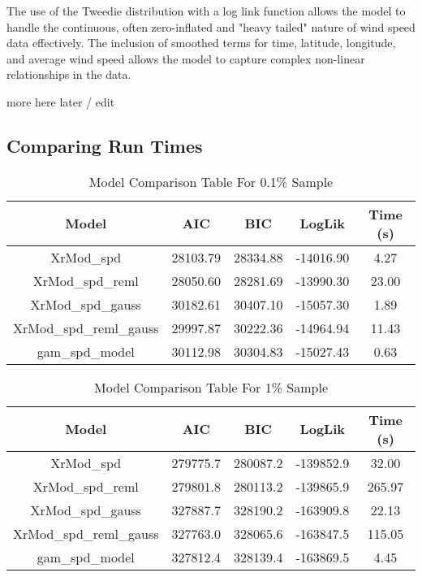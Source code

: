 The use of the Tweedie distribution with a log link function allows the model to handle the continuous, often zero-inflated and "heavy tailed" nature of wind speed data effectively. The inclusion of smoothed terms for time, latitude, longitude, and average wind speed allows the model to capture complex non-linear relationships in the data.
\newline

more here later / edit 

\subsection{Comparing Run Times}

\begin{table}[h]
    \centering
    \caption{Model Comparison Table For 0.1\% Sample}
    \label{tab:model_comparison_2}
    \begin{tabular}{|c|c|c|c|c|}
        \hline
        Model & AIC & BIC & LogLik & Time (s) \\
        \hline
        XrMod\_spd & 28103.79 & 28334.88 & -14016.90 & 4.27 \\
        XrMod\_spd\_reml & 28050.60 & 28281.69 & -13990.30 & 23.00 \\
        XrMod\_spd\_gauss & 30182.61 & 30407.10 & -15057.30 & 1.89 \\
        XrMod\_spd\_reml\_gauss & 29997.87 & 30222.36 & -14964.94 & 11.43 \\
        gam\_spd\_model & 30112.98 & 30304.83 & -15027.43 & 0.63 \\
        \hline
    \end{tabular}
\end{table}


\begin{table}[h]
    \centering
    \caption{Model Comparison Table For 1\% Sample}
    \label{tab:model_comparison}
    \begin{tabular}{|c|c|c|c|c|}
        \hline
        Model & AIC & BIC & LogLik & Time (s) \\
        \hline
        XrMod\_spd & 279775.7 & 280087.2 & -139852.9 & 32.00 \\
        XrMod\_spd\_reml & 279801.8 & 280113.2 & -139865.9 & 265.97 \\
        XrMod\_spd\_gauss & 327887.7 & 328190.2 & -163909.8 & 22.13 \\
        XrMod\_spd\_reml\_gauss & 327763.0 & 328065.6 & -163847.5 & 115.05 \\
        gam\_spd\_model & 327812.4 & 328139.4 & -163869.5 & 4.45 \\
        \hline
    \end{tabular}
\end{table}



